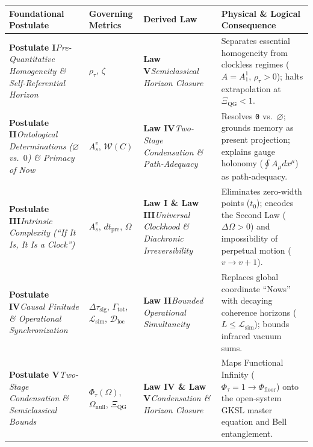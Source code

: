 \documentclass[
]{article}
\newcounter{none} %
\begin{document}
{\def\LTcaptype{none} %
\begin{longtable}[]{@{}
  >{\raggedright\arraybackslash}p{}
  >{\raggedright\arraybackslash}p{}
  >{\raggedright\arraybackslash}p{}
  >{\raggedright\arraybackslash}p{}@{}}
\toprule\noalign{}
\begin{minipage}[b]{\linewidth}\raggedright
Foundational Postulate
\end{minipage} & \begin{minipage}[b]{\linewidth}\raggedright
Governing Metrics
\end{minipage} & \begin{minipage}[b]{\linewidth}\raggedright
Derived Law
\end{minipage} & \begin{minipage}[b]{\linewidth}\raggedright
Physical \& Logical Consequence
\end{minipage} \\
\midrule\noalign{}
\endhead
\bottomrule\noalign{}
\endlastfoot
\textbf{Postulate I}\emph{Pre-Quantitative Homogeneity \&
Self-Referential Horizon} & \(\rho_\tau\), \(\zeta\) & \textbf{Law
V}\emph{Semiclassical Horizon Closure} & Separates essential homogeneity
from clockless regimes (\(A = A_1^1\), \(\rho_\tau > 0\)); halts
extrapolation at \(\Xi_{\mathrm{QG}} < 1\). \\
\textbf{Postulate II}\emph{Ontological Determinations (\(\varnothing\)
vs.~\(0\)) \& Primacy of Now} & \(A_s^v\), \(\mathcal{W}(C)\) &
\textbf{Law IV}\emph{Two-Stage Condensation \& Path-Adequacy} & Resolves
\texttt{0} vs.~\(\varnothing\); grounds memory as present projection;
explains gauge holonomy (\(\oint A_\mu dx^\mu\)) as path-adequacy. \\
\textbf{Postulate III}\emph{Intrinsic Complexity (``If It Is, It Is a
Clock'')} & \(A_s^v\), \(dt_{\mathrm{pre}}\), \(\Omega\) & \textbf{Law I
\& Law III}\emph{Universal Clockhood \& Diachronic Irreversibility} &
Eliminates zero-width points (\(t_0\)); encodes the Second Law
(\(\Delta\Omega > 0\)) and impossibility of perpetual motion
(\(v \to v+1\)). \\
\textbf{Postulate IV}\emph{Causal Finitude \& Operational
Synchronization} & \(\Delta\tau_{\mathrm{sig}}\),
\(\Gamma_{\mathrm{tot}}\), \(\mathcal{L}_{\mathrm{sim}}\),
\(\mathcal{D}_{\mathrm{loc}}\) & \textbf{Law II}\emph{Bounded
Operational Simultaneity} & Replaces global coordinate ``Nows'' with
decaying coherence horizons (\(L \le \mathcal{L}_{\mathrm{sim}}\));
bounds infrared vacuum sums. \\
\textbf{Postulate V}\emph{Two-Stage Condensation \& Semiclassical
Bounds} & \(\Phi_\tau(\Omega)\), \(\Omega_{\mathrm{null}}\),
\(\Xi_{\mathrm{QG}}\) & \textbf{Law IV \& Law V}\emph{Condensation \&
Horizon Closure} & Maps Functional Infinity
(\(\Phi_\tau = 1 \to \Phi_{\mathrm{floor}}\)) onto the open-system GKSL
master equation and Bell entanglement. \\
\end{longtable}
}
\end{document}
